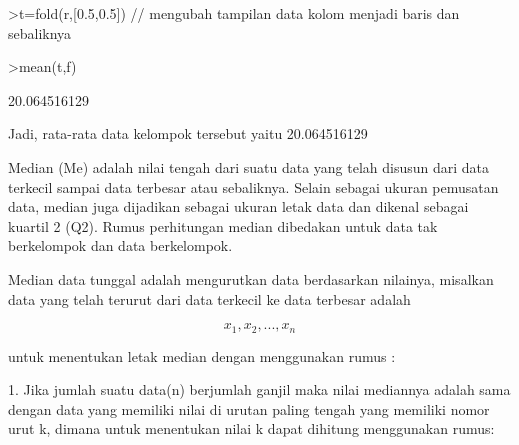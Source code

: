 \documentclass[a4paper,10pt]{article}
\begin{document}
\begin{eulernotebook}
\begin{eulercomment}
\begin{eulercomment}
\begin{eulercomment}
\begin{eulercomment}
\begin{eulercomment}
\begin{eulercomment}
\begin{eulercomment}
\begin{eulercomment}
\begin{eulercomment}
\begin{eulercomment}
\begin{eulercomment}
\begin{eulercomment}
\begin{eulercomment}
\begin{eulercomment}
\begin{eulerprompt}
>t=fold(r,[0.5,0.5]) // mengubah tampilan data kolom menjadi baris dan sebaliknya
\end{eulerprompt}
\begin{euleroutput}
  [12,  17,  22,  27]
\end{euleroutput}
\begin{eulerprompt}
>mean(t,f)
\end{eulerprompt}
\begin{euleroutput}
  20.064516129
\end{euleroutput}
\begin{eulercomment}
Jadi, rata-rata data kelompok tersebut yaitu 20.064516129\\
\end{eulercomment}
\begin{eulercomment}
Median (Me) adalah nilai tengah dari suatu data yang telah disusun
dari data terkecil sampai data terbesar atau sebaliknya. Selain
sebagai ukuran pemusatan data, median juga dijadikan sebagai ukuran
letak data dan dikenal sebagai kuartil 2 (Q2). Rumus perhitungan
median dibedakan untuk data tak berkelompok dan data berkelompok.

\end{eulercomment}
\begin{eulercomment}
Median data tunggal adalah mengurutkan data berdasarkan nilainya,
misalkan data yang telah terurut dari data terkecil ke data terbesar
adalah\\
\end{eulercomment}
\begin{eulerformula}
\[
x_1, x_2,..., x_n
\]
\end{eulerformula}
\begin{eulerttcomment}
 untuk menentukan letak median dengan menggunakan rumus :
\end{eulerttcomment}
\begin{eulercomment}
1. Jika jumlah suatu data(n) berjumlah ganjil maka nilai mediannya
adalah sama dengan data yang memiliki nilai di urutan paling tengah
yang memiliki nomor urut k, dimana untuk menentukan nilai k dapat
dihitung menggunakan rumus:


\end{eulercomment}
\end{eulercomment}
\end{eulercomment}
\end{eulercomment}
\end{eulercomment}
\end{eulercomment}
\end{eulercomment}
\end{eulercomment}
\end{eulercomment}
\end{eulercomment}
\end{eulercomment}
\end{eulercomment}
\end{eulercomment}
\end{eulercomment}
\end{eulercomment}
\end{eulernotebook}
\end{document}
